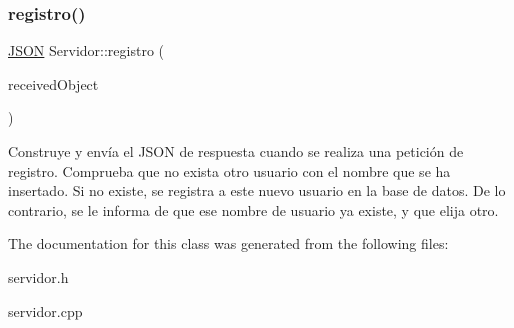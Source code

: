 \subsubsection{\texorpdfstring{registro()}{registro()}}
{\footnotesize\ttfamily \mbox{\hyperlink{classnlohmann_1_1basic__json}{J\+S\+ON}} Servidor\+::registro (\begin{DoxyParamCaption}\item[{\mbox{\hyperlink{classnlohmann_1_1basic__json}{J\+S\+ON}}}]{received\+Object }\end{DoxyParamCaption})}

Construye y envía el J\+S\+ON de respuesta cuando se realiza una petición de registro. Comprueba que no exista otro usuario con el nombre que se ha insertado. Si no existe, se registra a este nuevo usuario en la base de datos. De lo contrario, se le informa de que ese nombre de usuario ya existe, y que elija otro. 

The documentation for this class was generated from the following files\+:\begin{DoxyCompactItemize}
\item 
servidor.\+h\item 
servidor.\+cpp\end{DoxyCompactItemize}
